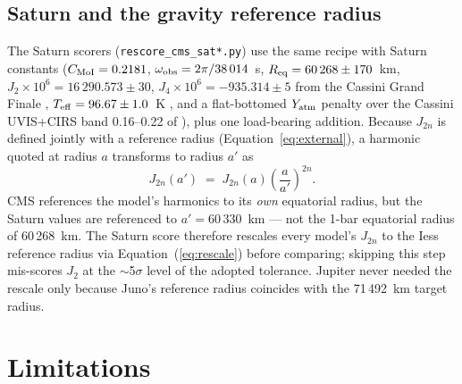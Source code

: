 \documentclass{aastex631}
\newcommand{\Req}{R_{\rm eq}}
\begin{document}
\subsection{Saturn and the gravity reference radius}
\label{sec:saturn_rescale}

The Saturn scorers (\texttt{rescore\_cms\_sat*.py}) use the same recipe
with Saturn constants ($C_{\rm MoI} = 0.2181$,
$\omega_{\rm obs} = 2\pi/38\,014$~s,
$\Req = 60\,268 \pm 170$~km,
$J_2 \times 10^6 = 16\,290.573 \pm 30$,
$J_4 \times 10^6 = -935.314 \pm 5$ from the Cassini Grand Finale
\citep{Iess2019}, $T_{\rm eff} = 96.67 \pm 1.0$~K \citep{Li2015}, and a
flat-bottomed $Y_{\rm atm}$ penalty over the Cassini UVIS+CIRS band
0.16--0.22 of \citealt{KoskinenGuerlet2018}), plus one load-bearing
addition.  Because $J_{2n}$ is defined jointly with a reference radius
(Equation~\ref{eq:external}), a harmonic quoted at radius $a$ transforms
to radius $a'$ as
\begin{equation}
J_{2n}(a') \;=\; J_{2n}(a) \left(\frac{a}{a'}\right)^{2n} .
\label{eq:rescale}
\end{equation}
CMS references the model's harmonics to its \emph{own} equatorial
radius, but the \citet{Iess2019} Saturn values are referenced to
$a' = 60\,330$~km --- not the 1-bar equatorial radius of 60\,268~km.
The Saturn score therefore rescales every model's $J_{2n}$ to the Iess
reference radius via Equation~(\ref{eq:rescale}) before comparing;
skipping this step mis-scores $J_2$ at the $\sim$5$\sigma$ level of the
adopted tolerance.  Jupiter never needed the rescale only because
Juno's reference radius coincides with the 71\,492~km target radius.

\section{Limitations}\label{sec:limitations}
\end{document}
